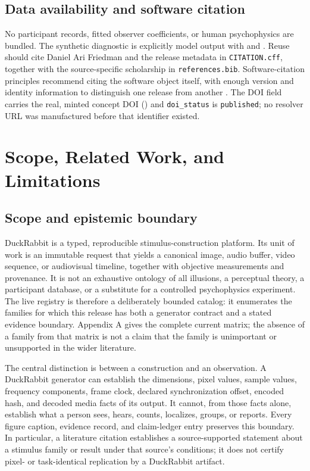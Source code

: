 \documentclass[
  english,
]{article}
\newcounter{none} %
\begin{document}
\subsection{Data availability and software
citation}\label{data-availability-and-software-citation}

No participant records, fitted observer coefficients, or human
psychophysics are bundled. The synthetic diagnostic is explicitly model
output with  and .
Reuse should cite Daniel Ari Friedman and the release metadata in
\texttt{CITATION.cff}, together with the source-specific scholarship in
\texttt{references.bib}. Software-citation principles recommend citing
the software object itself, with enough version and identity information
to distinguish one release from another \citep{smith2016software}. The
DOI field carries the real, minted concept DOI
() and \texttt{doi\_status} is
\texttt{published}; no resolver URL was manufactured before that
identifier existed.

\newpage

\section{Scope, Related Work, and Limitations}\label{sec:scope}

\subsection{Scope and epistemic
boundary}\label{scope-and-epistemic-boundary}

DuckRabbit is a typed, reproducible stimulus-construction platform. Its
unit of work is an immutable request that yields a canonical image,
audio buffer, video sequence, or audiovisual timeline, together with
objective measurements and provenance. It is not an exhaustive ontology
of all illusions, a perceptual theory, a participant database, or a
substitute for a controlled psychophysics experiment. The live registry
is therefore a deliberately bounded catalog: it enumerates the families
for which this release has both a generator contract and a stated
evidence boundary. Appendix A gives the complete current matrix; the
absence of a family from that matrix is not a claim that the family is
unimportant or unsupported in the wider literature.

The central distinction is between a construction and an observation. A
DuckRabbit generator can establish the dimensions, pixel values, sample
values, frequency components, frame clock, declared synchronization
offset, encoded hash, and decoded media facts of its output. It cannot,
from those facts alone, establish what a person sees, hears, counts,
localizes, groups, or reports. Every figure caption, evidence record,
and claim-ledger entry preserves this boundary. In particular, a
literature citation establishes a source-supported statement about a
stimulus family or result under that source's conditions; it does not
certify pixel- or task-identical replication by a DuckRabbit artifact.
\end{document}
